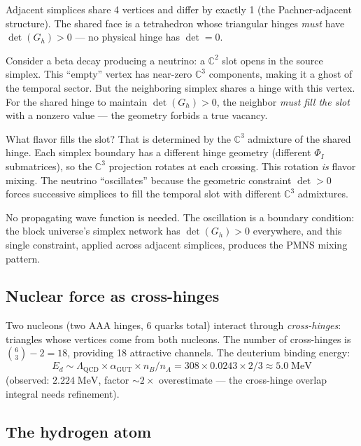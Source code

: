 \documentclass[12pt]{article}
\theoremstyle{remark}
\theoremstyle{definition}
\begin{document}
Adjacent simplices share 4 vertices and differ by exactly 1 (the Pachner-adjacent structure). The shared face is a tetrahedron whose triangular hinges \emph{must} have $\det(G_h) > 0$ --- no physical hinge has $\det = 0$.

Consider a beta decay producing a neutrino: a $\mathbb{C}^2$ slot opens in the source simplex. This ``empty'' vertex has near-zero $\mathbb{C}^3$ components, making it a ghost of the temporal sector. But the neighboring simplex shares a hinge with this vertex. For the shared hinge to maintain $\det(G_h) > 0$, the neighbor \emph{must fill the slot} with a nonzero value --- the geometry forbids a true vacancy.

What flavor fills the slot? That is determined by the $\mathbb{C}^3$ admixture of the shared hinge. Each simplex boundary has a different hinge geometry (different $\Phi_I$ submatrices), so the $\mathbb{C}^3$ projection rotates at each crossing. This rotation \emph{is} flavor mixing. The neutrino ``oscillates'' because the geometric constraint $\det > 0$ forces successive simplices to fill the temporal slot with different $\mathbb{C}^3$ admixtures.

No propagating wave function is needed. The oscillation is a boundary condition: the block universe's simplex network has $\det(G_h) > 0$ everywhere, and this single constraint, applied across adjacent simplices, produces the PMNS mixing pattern.

\subsection{Nuclear force as cross-hinges}

Two nucleons (two AAA hinges, 6 quarks total) interact through \emph{cross-hinges}: triangles whose vertices come from both nucleons. The number of cross-hinges is $\binom{6}{3} - 2 = 18$, providing 18 attractive channels. The deuterium binding energy:
\begin{equation}
E_d \sim \Lambda_\text{QCD} \times \alpha_\text{GUT} \times n_B/n_A = 308 \times 0.0243 \times 2/3 \approx 5.0\;\text{MeV}
\end{equation}
(observed: $2.224\;\text{MeV}$, factor $\sim 2\times$ overestimate --- the cross-hinge overlap integral needs refinement).

\subsection{The hydrogen atom}
\end{document}

